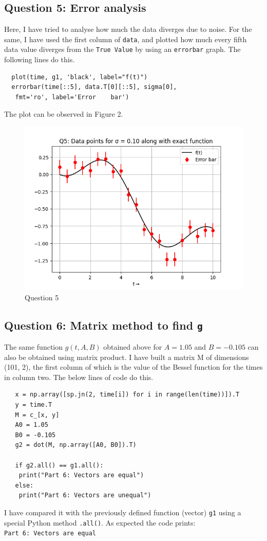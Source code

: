 \documentclass[11pt, a4paper]{article}
\begin{document}
 \subsection{Question 5: Error analysis}
 Here, I have tried to analyse how much the data diverges due to noise. For the same, I have used the first column of \texttt{data}, and plotted how much every fifth data value diverges from the \texttt{True Value} by using an \texttt{errorbar} graph. The following lines do this.
 \begin{verbatim}
  plot(time, g1, 'black', label="f(t)")
  errorbar(time[::5], data.T[0][::5], sigma[0],
   fmt='ro', label='Error    bar')
 \end{verbatim}  
 The plot can be observed in Figure 2.
 \begin{figure}[!tbh]
   	\centering
   	\includegraphics[scale=0.5]{Q5.png} 
	\caption{Question 5}
   	\label{fig:Q5}
 \end{figure}
 
 \subsection{Question 6: Matrix method to find \texttt{g}}
 The same function $g(t, A, B)$ obtained above for $A=1.05$ and $B=-0.105$ can also be obtained using matrix product. I have built a matrix M of dimensions (101, 2), the first column of which is the value of the Bessel function for the times in column two. The below lines of code do this.
   \begin{verbatim}
   x = np.array([sp.jn(2, time[i]) for i in range(len(time))]).T
   y = time.T
   M = c_[x, y]
   A0 = 1.05
   B0 = -0.105
   g2 = dot(M, np.array([A0, B0]).T)
   
   if g2.all() == g1.all():
    print("Part 6: Vectors are equal")
   else:
    print("Part 6: Vectors are unequal")
   \end{verbatim}
  I have compared it with the previously defined function (vector) \texttt{g1} using a special Python method \texttt{.all()}. As expected the code prints:\\ \texttt{Part 6: Vectors are equal}
  
\end{document}
